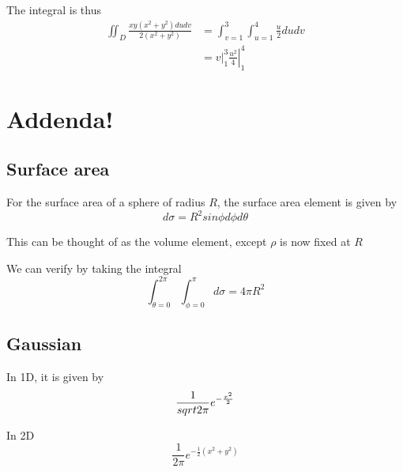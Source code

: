 The integral is thus
\begin{align*}
   \iint_{D} \frac{xy (x^2 + y^2) dudv}{2 (x^2 + y^2)}  &= \int_{v = 1}^{3}  \int_{u = 1}^{4}  \frac{u}{2} du dv \\
                                                        &= \left. v \right|_{1}^{3} \left. \frac{u^2}{4} \right|_{1}^{4} 
\end{align*}

\section{Addenda!}

\subsection{Surface area}

For the surface area of a sphere of radius $R$, the surface area element is given by
\[
  d \sigma = R^2 sin \phi d \phi d \theta
\] 

This can be thought of as the volume element, except $\rho $ is now fixed at $R$

We can verify by taking the integral
 \[
  \int_{ \theta = 0}^{ 2 \pi}  \int_{ \phi = 0}^{ \pi}  d \sigma = 4 \pi R^2  
\] 

\subsection{Gaussian}

In 1D, it is given by
\[
   \frac{1}{\\sqrt{{2 \pi}}} e^{- \frac{x^2}{2}}
\] 

In 2D
\[
   \frac{1}{2 \pi} e^{ -\frac{1}{2} \left( x^2 + y^2 \right) } 
\] 





















